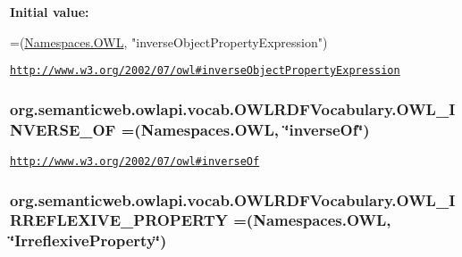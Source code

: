 {\bfseries Initial value\-:}
\begin{DoxyCode}
=(\hyperlink{enumorg_1_1semanticweb_1_1owlapi_1_1vocab_1_1_namespaces_a2fcb537074d9307ef1356ffb6a5bd6f4}{Namespaces.OWL},
            \textcolor{stringliteral}{"inverseObjectPropertyExpression"})
\end{DoxyCode}
\href{http://www.w3.org/2002/07/owl#inverseObjectPropertyExpression}{\tt http\-://www.\-w3.\-org/2002/07/owl\#inverse\-Object\-Property\-Expression} \hypertarget{enumorg_1_1semanticweb_1_1owlapi_1_1vocab_1_1_o_w_l_r_d_f_vocabulary_ae0754d694ca7d79857d068faf1dc6bb6}{
\subsubsection[{O\-W\-L\-\_\-\-I\-N\-V\-E\-R\-S\-E\-\_\-\-O\-F}]{\setlength{\rightskip}{0pt plus 5cm}org.\-semanticweb.\-owlapi.\-vocab.\-O\-W\-L\-R\-D\-F\-Vocabulary.\-O\-W\-L\-\_\-\-I\-N\-V\-E\-R\-S\-E\-\_\-\-O\-F =({\bf Namespaces.\-O\-W\-L}, \char`\"{}inverse\-Of\char`\"{})}}\label{enumorg_1_1semanticweb_1_1owlapi_1_1vocab_1_1_o_w_l_r_d_f_vocabulary_ae0754d694ca7d79857d068faf1dc6bb6}
\href{http://www.w3.org/2002/07/owl#inverseOf}{\tt http\-://www.\-w3.\-org/2002/07/owl\#inverse\-Of} \hypertarget{enumorg_1_1semanticweb_1_1owlapi_1_1vocab_1_1_o_w_l_r_d_f_vocabulary_ae49f4011fd7ac569f9da0a7843de7619}{
\subsubsection[{O\-W\-L\-\_\-\-I\-R\-R\-E\-F\-L\-E\-X\-I\-V\-E\-\_\-\-P\-R\-O\-P\-E\-R\-T\-Y}]{\setlength{\rightskip}{0pt plus 5cm}org.\-semanticweb.\-owlapi.\-vocab.\-O\-W\-L\-R\-D\-F\-Vocabulary.\-O\-W\-L\-\_\-\-I\-R\-R\-E\-F\-L\-E\-X\-I\-V\-E\-\_\-\-P\-R\-O\-P\-E\-R\-T\-Y =({\bf Namespaces.\-O\-W\-L}, \char`\"{}Irreflexive\-Property\char`\"{})}}\label{enumorg_1_1semanticweb_1_1owlapi_1_1vocab_1_1_o_w_l_r_d_f_vocabulary_ae49f4011fd7ac569f9da0a7843de7619}
